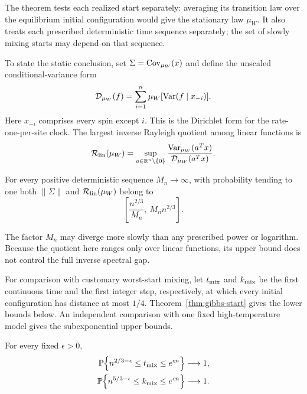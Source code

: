 The theorem tests each realized start separately: averaging its transition
law over the equilibrium initial configuration would give the stationary
law $\mu_W$. It also treats each prescribed deterministic time sequence
separately; the set of slowly mixing starts may depend on that sequence.

To state the static conclusion, set $\Sigma=\operatorname{Cov}_{\mu_W}(x)$ and define
the unscaled conditional-variance form
\[
 \mathcal D_{\mu_W}(f)
 =\sum_{i=1}^n\mu_W[\operatorname{Var}(f\mid x_{-i})].
\]
Here $x_{-i}$ comprises every spin except $i$. This is the Dirichlet
form for the rate-one-per-site clock. The largest inverse Rayleigh quotient
among linear functions is
\[
 \mathcal R_{\rm lin}(\mu_W)
 =\sup_{a\in\mathbb R^n\setminus\{0\}}
   \frac{\operatorname{Var}_{\mu_W}(a^Tx)}{\mathcal D_{\mu_W}(a^Tx)}.
\]

\begin{theorem}\label{thm:linear-scale}
For every positive deterministic sequence $M_n\to\infty$, with probability tending to one both $\|\Sigma\|$ and $\mathcal R_{\rm lin}(\mu_W)$ belong to
\[
 \left[\frac{n^{2/3}}{M_n},\ M_n n^{2/3}\right].
\]
\end{theorem}

The factor $M_n$ may diverge more slowly than any prescribed power or
logarithm. Because the quotient here ranges only over linear functions,
its upper bound does not control the full inverse spectral gap.

For comparison with customary worst-start mixing, let $t_{\rm mix}$ and
$k_{\rm mix}$ be the first continuous time and the first integer step,
respectively, at which every initial configuration has distance at most
$1/4$. Theorem~\ref{thm:gibbs-start} gives the lower bounds below. An
independent comparison with one fixed high-temperature model gives the
subexponential upper bounds.

\begin{theorem}\label{thm:mixing}
For every fixed $\epsilon>0$,
\begin{align}
 \mathbb P\!\left\{n^{2/3-\epsilon}\le t_{\rm mix}
                   \le e^{\epsilon n}\right\}&\longrightarrow1,
       \label{eq:continuous-main}\\
 \mathbb P\!\left\{n^{5/3-\epsilon}\le k_{\rm mix}
                   \le e^{\epsilon n}\right\}&\longrightarrow1.
       \label{eq:discrete-main}
\end{align}
\end{theorem}


